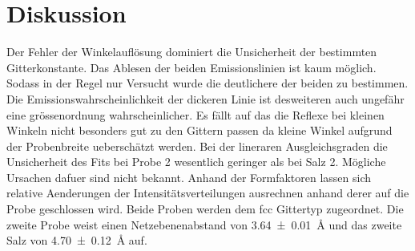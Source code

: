 \section{Diskussion}\label{sec:Diskussion}
Der Fehler der Winkelauflösung  dominiert die Unsicherheit der bestimmten
Gitterkonstante. 
Das Ablesen der beiden Emissionslinien ist kaum möglich. 
Sodass in der Regel nur Versucht wurde die deutlichere der beiden zu bestimmen.
Die Emissionswahrscheinlichkeit der dickeren Linie ist desweiteren auch
ungefähr eine grössenordnung wahrscheinlicher. 
Es fällt auf das die Reflexe bei kleinen Winkeln nicht besonders gut zu den
Gittern passen da kleine Winkel aufgrund der Probenbreite ueberschätzt werden.
Bei der lineraren Ausgleichsgraden die Unsicherheit des Fits bei Probe 2 
wesentlich geringer als bei Salz 2. 
Mögliche Ursachen dafuer sind nicht bekannt. 
Anhand der Formfaktoren lassen sich relative Aenderungen der Intensitätsverteilungen ausrechnen
anhand derer auf die Probe geschlossen wird.
Beide Proben werden dem fcc Gittertyp zugeordnet. 
Die zweite Probe weist einen Netzebenenabstand von \SI{3.64 +- 0.01}{\angstrom}
und das zweite Salz von \SI{4.70 +- 0.12}{\angstrom} auf.
